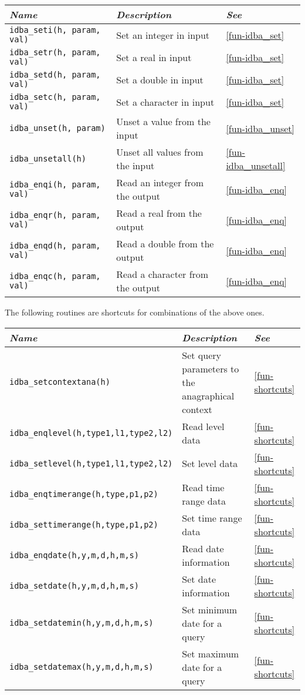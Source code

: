 \documentclass[final,12pt,a4paper,twoside]{book}
\begin{document}
\begin{tabular}{|l|l|l|}
\hline
{\em Name}                      & {\em Description}                & {\em See} \\
\hline
{\tt \small idba\_seti(h, param, val)} & Set an integer in input          & \ref{fun-idba_set} \\
{\tt \small idba\_setr(h, param, val)} & Set a real in input              & \ref{fun-idba_set} \\
{\tt \small idba\_setd(h, param, val)} & Set a double in input            & \ref{fun-idba_set} \\
{\tt \small idba\_setc(h, param, val)} & Set a character in input         & \ref{fun-idba_set} \\
{\tt \small idba\_unset(h, param)}     & Unset a value from the input     & \ref{fun-idba_unset} \\
{\tt \small idba\_unsetall(h)}         & Unset all values from the input  & \ref{fun-idba_unsetall} \\
{\tt \small idba\_enqi(h, param, val)} & Read an integer from the output  & \ref{fun-idba_enq} \\
{\tt \small idba\_enqr(h, param, val)} & Read a real from the output      & \ref{fun-idba_enq} \\
{\tt \small idba\_enqd(h, param, val)} & Read a double from the output    & \ref{fun-idba_enq} \\
{\tt \small idba\_enqc(h, param, val)} & Read a character from the output & \ref{fun-idba_enq} \\
\hline
\end{tabular}

The following routines are shortcuts for combinations of the above ones.

\begin{tabular}{|l|p{6cm}|l|}
\hline
{\em Name}					& {\em Description}	& {\em See} \\
\hline
{\tt \small idba\_setcontextana(h)}		& Set query parameters to the anagraphical context & \ref{fun-shortcuts} \\
{\tt \small idba\_enqlevel(h,type1,l1,type2,l2)}	& Read level data	& \ref{fun-shortcuts} \\
{\tt \small idba\_setlevel(h,type1,l1,type2,l2)}	& Set level data	& \ref{fun-shortcuts} \\
{\tt \small idba\_enqtimerange(h,type,p1,p2)}	& Read time range data	& \ref{fun-shortcuts} \\
{\tt \small idba\_settimerange(h,type,p1,p2)}	& Set time range data	& \ref{fun-shortcuts} \\
{\tt \small idba\_enqdate(h,y,m,d,h,m,s)}	& Read date information & \ref{fun-shortcuts} \\
{\tt \small idba\_setdate(h,y,m,d,h,m,s)}	& Set date information	& \ref{fun-shortcuts} \\
{\tt \small idba\_setdatemin(h,y,m,d,h,m,s)}	& Set minimum date for a query	   & \ref{fun-shortcuts} \\
{\tt \small idba\_setdatemax(h,y,m,d,h,m,s)}	& Set maximum date for a query	   & \ref{fun-shortcuts} \\
\hline
\end{tabular}
\end{document}
